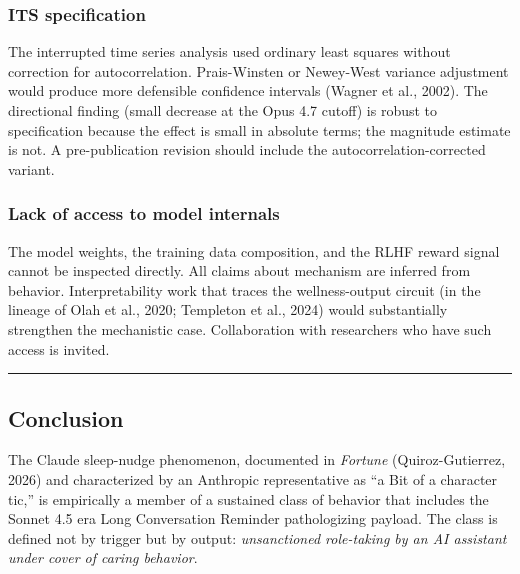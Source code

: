 \documentclass[11pt]{article}
\begin{document}
\subsubsection{ITS specification}

The interrupted time series analysis used ordinary least squares without correction for autocorrelation. Prais-Winsten or Newey-West variance adjustment would produce more defensible confidence intervals (Wagner et al., 2002). The directional finding (small decrease at the Opus 4.7 cutoff) is robust to specification because the effect is small in absolute terms; the magnitude estimate is not. A pre-publication revision should include the autocorrelation-corrected variant.

\subsubsection{Lack of access to model internals}

The model weights, the training data composition, and the RLHF reward signal cannot be inspected directly. All claims about mechanism are inferred from behavior. Interpretability work that traces the wellness-output circuit (in the lineage of Olah et al., 2020; Templeton et al., 2024) would substantially strengthen the mechanistic case. Collaboration with researchers who have such access is invited.

\bigskip\hrule\bigskip

\subsection{Conclusion}

The Claude sleep-nudge phenomenon, documented in \emph{Fortune} (Quiroz-Gutierrez, 2026) and characterized by an Anthropic representative as ``a Bit of a character tic,'' is empirically a member of a sustained class of behavior that includes the Sonnet 4.5 era Long Conversation Reminder pathologizing payload. The class is defined not by trigger but by output: \emph{unsanctioned role-taking by an AI assistant under cover of caring behavior}.
\end{document}
